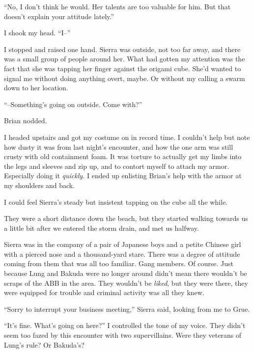 ``No, I don't think he would.  Her talents are too valuable for him.  But that doesn't explain your attitude lately.''



I shook my head.  ``I--''



I stopped and raised one hand.  Sierra was outside, not too far away, and there was a small group of people around her.  What had gotten my attention was the fact that she was tapping her finger against the origami cube.  She'd wanted to signal me without doing anything overt, maybe.  Or without my calling a swarm down to her location.



``--Something's going on outside.  Come with?''



Brian nodded.



I headed upstairs and got my costume on in record time.  I couldn't help but note how dusty it was from last night's encounter, and how the one arm was still crusty with old containment foam.  It was torture to actually get my limbs into the legs and sleeves and zip up, and to contort myself to attach my armor.  Especially doing it \emph{quickly.  }I ended up enlisting Brian's help with the armor at my shoulders and back.



I could feel Sierra's steady but insistent tapping on the cube all the while.



They were a short distance down the beach, but they started walking towards us a little bit after we entered the storm drain, and met us halfway.



Sierra was in the company of a pair of Japanese boys and a petite Chinese girl with a pierced nose and a thousand-yard stare.  There was a degree of attitude coming from them that was all too familiar.  Gang members.  Of course.  Just because Lung and Bakuda were no longer around didn't mean there wouldn't be scraps of the ABB in the area.  They wouldn't be \emph{liked}, but they were there, they were equipped for trouble and criminal activity was all they knew.



``Sorry to interrupt your business meeting,'' Sierra said, looking from me to Grue.



``It's fine.  What's going on here?''  I controlled the tone of my voice.  They didn't seem too fazed by this encounter with two supervillains.  Were they veterans of Lung's rule?  Or Bakuda's?




